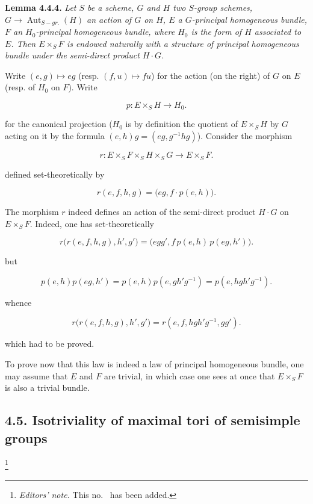 \textbf{Lemma 4.4.4.} \emph{Let \(S\) be a scheme, \(G\) and \(H\) two \(S\)-group schemes, \(G \to \operatorname{Aut}_{S-gr.}(H)\) an
action of \(G\) on \(H\), \(E\) a \(G\)-principal homogeneous bundle, \(F\) an \(H_0\)-principal homogeneous bundle, where \(H_0\) is
the form of \(H\) associated to \(E\). Then \(E \times_{S} F\) is endowed naturally with a structure of principal homogeneous
bundle under the semi-direct product \(H \cdot G\).}

Write \((e, g) \mapsto eg\) (resp. \((f, u) \mapsto f u\)) for the action (on the right) of \(G\) on \(E\) (resp. of \(H_0\) on
\(F\)). Write

\[
  p:E\times_S H\longrightarrow H_0.
\]

for the canonical projection (\(H_0\) is by definition the quotient of \(E \times_{S} H\) by \(G\) acting on it by the formula
\((e, h) g = (eg, g^{-1} h g)\)). Consider the morphism

\[
  r:E\times_S F\times_S H\times_S G\longrightarrow E\times_S F.
\]

defined set-theoretically by

\[
  r(e,f,h,g)=\bigl(eg,f\cdot p(e,h)\bigr).
\]

The morphism \(r\) indeed defines an action of the semi-direct product \(H \cdot G\) on \(E \times_{S} F\). Indeed, one has
set-theoretically

\[
  r\bigl(r(e,f,h,g),h',g'\bigr)
  =\bigl(egg',f\,p(e,h)\,p(eg,h')\bigr).
\]

but

\[
  p(e,h)p(eg,h')
  =p(e,h)p(e,gh'g^{-1})
  =p(e,hgh'g^{-1}).
\]

whence

\[
  r\bigl(r(e,f,h,g),h',g'\bigr)
  =r(e,f,hgh'g^{-1},gg').
\]

which had to be proved.

To prove now that this law is indeed a law of principal homogeneous bundle, one may assume that \(E\) and \(F\) are trivial,
in which case one sees at once that \(E \times_{S} F\) is also a trivial bundle.

\subsection*{4.5. Isotriviality of maximal tori of semisimple groups}
\footnote{\textit{Editors' note.} This no.~ has been added.}

